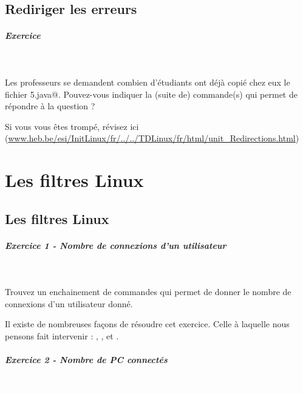\documentclass[11pt,a4paper]{article}
\begin{document}
        \subsection{Rediriger les erreurs}
			
		\subparagraph{Exercice} 
		
					\textcolor{white}{.} \par
				
            \par
        
					Les professeurs se demandent combien
					d'\'etudiants ont d\'ej\`a copi\'e chez eux
					le fichier 
					\verb@Multiple5.java@.
					Pouvez-vous indiquer la (suite de) commande(s)
					qui permet de r\'epondre \`a la question ?
				
            \par
         Si vous vous \^etes tromp\'e, r\'evisez ici (\url{www.heb.be/esi/InitLinux/fr/../../TDLinux/fr/html/unit\_Redirections.html})
            \par
        \section{Les filtres Linux}\subsection{Les filtres Linux}
			
		\subparagraph{Exercice 1 - Nombre de connexions d'un utilisateur} 
		
					\textcolor{white}{.} \par
				
            \par
        
					Trouvez un enchainement de commandes
					qui permet de donner le nombre de connexions
					d'un utilisateur donn\'e.
				
            \par
        
					Il existe de nombreuses fa\c cons de r\'esoudre
					cet exercice. 
					Celle \`a laquelle nous pensons fait intervenir :
					\verb@grep@,
					\verb@wc@,
					et \verb@who@.
				
            \par
        
			
		\subparagraph{Exercice 2 - Nombre de PC connect\'es} 
		
					\textcolor{white}{.} \par
				
\end{document}
